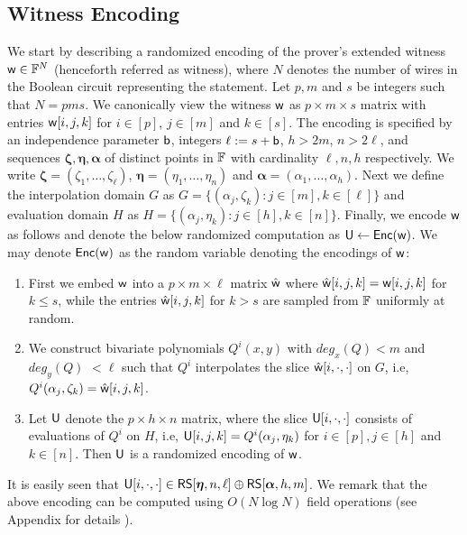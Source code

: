 
\subsection{Witness Encoding}\label{sec:witencoding}
We start by describing a randomized encoding of the prover's extended witness $\mathsf{w}\in \mathbb{F}^N$ (henceforth referred as witness), where $N$ denotes the number of wires in the Boolean circuit representing the statement. Let $p,m$ and
$s$ be integers such that $N=pms$. We canonically view the
witness $\mathsf{w}$ 
as $p\times m\times s$ matrix with entries $\mathsf{w}[i,j,k]$ for $i\in [p]$,
$j\in [m]$ and $k\in [s]$. The encoding is specified by an independence 
parameter $\mathsf{b}$, integers $\ell := s+\mathsf{b}$, $h>2m$, $n>2\ell$, and sequences
$\bm{\zeta},\bm{\eta},\bm{\alpha}$ of distinct points in $\mathbb{F}$ with cardinality 
$\ell,n,h$ respectively. We write $\bm{\zeta}=(\zeta_1,\ldots,\zeta_\ell)$,
$\bm{\eta}=(\eta_1,\ldots,\eta_n)$ and $\bm{\alpha}=(\alpha_1,\ldots,\alpha_h)$. 
Next we define the interpolation domain $G$ as $G=\{(\alpha_j,\zeta_k): j\in[m],
k\in [\ell]\}$ and evaluation domain $H$ as $H=\{(\alpha_j,\eta_k): j\in [h],
k\in [n]\}$. Finally, we encode $\mathsf{w}$ as follows and denote the below randomized computation as $\mathsf{U}\gets \mathsf{Enc}(\mathsf{w})$.
 We may denote $\mathsf{Enc}(\mathsf{w})$ as the random variable denoting the encodings of $\mathsf{w}$:
\begin{enumerate}[{\rm (i)}]
\item First we embed $\mathsf{w}$ into a $p\times m\times \ell$ matrix $\hat{\mathsf{w}}$
where $\hat{\mathsf{w}}[i,j,k]=\mathsf{w}[i,j,k]$ for $k\leq s$, while the entries
$\hat{\mathsf{w}}[i,j,k]$ for $k>s$ are sampled from $\mathbb{F}$ uniformly at random.
\item We construct bivariate polynomials $Q^i(x,y)$ with $deg_x(Q)<m$ and
$deg_y(Q) $ $<\ell$ such that $Q^i$ interpolates the slice
$\hat{\mathsf{w}}[i,\cdot,\cdot]$ on $G$, i.e,
$Q^i(\alpha_j,\zeta_k)=\hat{\mathsf{w}}[i,j,k]$. 
\item Let $\mathsf{U}$ denote the $p\times h\times n$ matrix, where the slice
$\mathsf{U}[i,\cdot,\cdot]$ consists of evaluations of $Q^i$ on $H$, i.e,
$\mathsf{U}[i,j,k]=Q^i(\alpha_j,\eta_k)$ for $i\in [p], j\in [h]$ and $k\in [n]$.
Then $\mathsf{U}$ is a randomized encoding of $\mathsf{w}$.
\end{enumerate}
 It is easily seen
that $\mathsf{U}[i,\cdot,\cdot]\in \mathsf{RS}[\bm{\eta},n,\ell]\oplus \mathsf{RS}[\bm{\alpha},h,m]$. We remark that the above
encoding can be computed using $O(N\log N)$ field operations (see Appendix for
details ).
